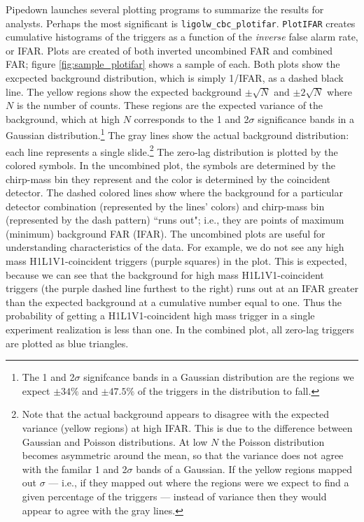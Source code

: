 Pipedown launches several plotting programs to summarize the results for
analysts. Perhaps the most significant is \verb|ligolw_cbc_plotifar|.
\texttt{PlotIFAR} creates cumulative histograms of the triggers as a function
of the \emph{inverse} false alarm rate, or IFAR. Plots are created of both
inverted uncombined \ac{FAR} and combined \ac{FAR}; figure
\ref{fig:sample_plotifar} shows a sample of each. Both plots show the excpected
background distribution, which is simply 1/IFAR, as a dashed black line. The
yellow regions show the expected background $\pm \sqrt{N}$ and $\pm 2\sqrt{N}$
where $N$ is the number of counts. These regions are the expected variance of
the background, which at high $N$ corresponds to the 1 and 2$\sigma$
significance bands in a Gaussian distribution.\footnote{The 1 and 2$\sigma$
signifcance bands in a Gaussian distribution are the regions we expect $\pm
34\%$ and $\pm 47.5\%$ of the triggers in the distribution to fall.} The gray
lines show the actual background distribution: each line represents a single
slide.\footnote{Note that the actual background appears to disagree with the
expected variance (yellow regions) at high IFAR. This is due to the difference
between Gaussian and Poisson distributions. At low $N$ the Poisson distribution
becomes asymmetric around the mean, so that the variance does not agree with
the familar 1 and 2$\sigma$ bands of a Gaussian. If the yellow regions mapped
out $\sigma$ --- i.e., if they mapped out where the regions were we expect to
find a given percentage of the triggers --- instead of variance then they would
appear to agree with the gray lines.} The zero-lag distribution is plotted by
the colored symbols. In the uncombined plot, the symbols are determined by the
chirp-mass bin they represent and the color is determined by the coincident
detector. The dashed colored lines show where the background for a particular
detector combination (represented by the lines' colors) and chirp-mass bin
(represented by the dash pattern) ``runs out"; i.e., they are points of maximum
(minimum) background \ac{FAR} (IFAR). The uncombined plots are useful for
understanding characteristics of the data. For example, we do not see any high
mass H1L1V1-coincident triggers (purple squares) in the plot. This is expected,
because we can see that the background for high mass H1L1V1-coincident triggers
(the purple dashed line furthest to the right) runs out at an IFAR greater than
the expected background at a cumulative number equal to one. Thus the
probability of getting a H1L1V1-coincident high mass trigger in a single
experiment realization is less than one. In the combined plot, all zero-lag
triggers are plotted as blue triangles.

